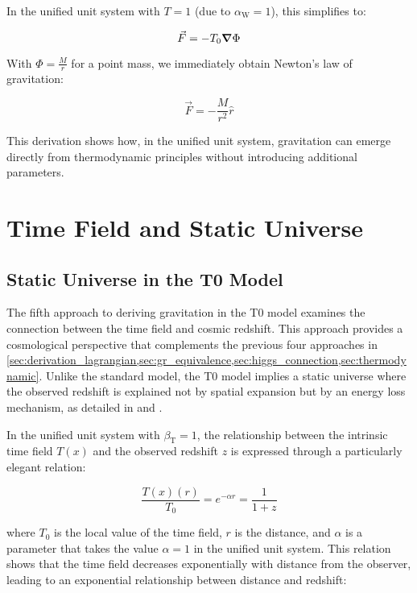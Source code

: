\documentclass[12pt,a4paper]{article}
\newcommand{\Tfield}{T(x)}
\newcommand{\Tzero}{T_0}
\newcommand{\betaT}{\beta_{\text{T}}}
\newcommand{\alphaW}{\alpha_{\text{W}}}
\begin{document}
	In the unified unit system with \(T = 1\) (due to \(\alphaW = 1\)), this simplifies to:
	
	\begin{equation}
		\vec{F} = -\Tzero \grad \Phi
	\end{equation}
	
	With \(\Phi = \frac{M}{r}\) for a point mass, we immediately obtain Newton's law of gravitation:
	
	\begin{equation}
		\vec{F} = -\frac{M}{r^2} \hat{r}
	\end{equation}
	
	This derivation shows how, in the unified unit system, gravitation can emerge directly from thermodynamic principles without introducing additional parameters.
	
	\section{Time Field and Static Universe}
	\label{sec:static_universe}
	
	\subsection{Static Universe in the T0 Model}
	\label{subsec:static_universe_model}
	The fifth approach to deriving gravitation in the T0 model examines the connection between the time field and cosmic redshift. This approach provides a cosmological perspective that complements the previous four approaches in \cref{sec:derivation_lagrangian,sec:gr_equivalence,sec:higgs_connection,sec:thermodynamic}. Unlike the standard model, the T0 model implies a static universe where the observed redshift is explained not by spatial expansion but by an energy loss mechanism, as detailed in \cite{pascher_messdifferenzen_2025} and \cite{pascher_galaxies_2025}.
	
	In the unified unit system with \(\betaT = 1\), the relationship between the intrinsic time field \(\Tfield\) and the observed redshift \(z\) is expressed through a particularly elegant relation:
	
	\begin{equation}
		\frac{\Tfield(r)}{\Tzero} = e^{-\alpha r} = \frac{1}{1+z}
	\end{equation}
	
	where \(\Tzero\) is the local value of the time field, \(r\) is the distance, and \(\alpha\) is a parameter that takes the value \(\alpha = 1\) in the unified unit system. This relation shows that the time field decreases exponentially with distance from the observer, leading to an exponential relationship between distance and redshift:
	
\end{document}
